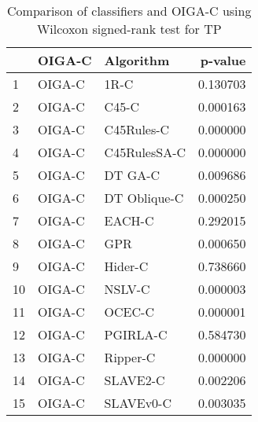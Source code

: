 \begin{table}
\footnotesize
\caption{Comparison of classifiers and OIGA-C using Wilcoxon signed-rank test for TP}
\label{tab:OIGA-C wilcoxon TP comparison}
\begin{tabular}{lllr}
\hline
 & OIGA-C & Algorithm & p-value \\
\hline
1 & OIGA-C & 1R-C & 0.130703 \\
2 & OIGA-C & C45-C & 0.000163 \\
3 & OIGA-C & C45Rules-C & 0.000000 \\
4 & OIGA-C & C45RulesSA-C & 0.000000 \\
5 & OIGA-C & DT GA-C & 0.009686 \\
6 & OIGA-C & DT Oblique-C & 0.000250 \\
7 & OIGA-C & EACH-C & 0.292015 \\
8 & OIGA-C & GPR & 0.000650 \\
9 & OIGA-C & Hider-C & 0.738660 \\
10 & OIGA-C & NSLV-C & 0.000003 \\
11 & OIGA-C & OCEC-C & 0.000001 \\
12 & OIGA-C & PGIRLA-C & 0.584730 \\
13 & OIGA-C & Ripper-C & 0.000000 \\
14 & OIGA-C & SLAVE2-C & 0.002206 \\
15 & OIGA-C & SLAVEv0-C & 0.003035 \\
\hline
\end{tabular}
\end{table}
